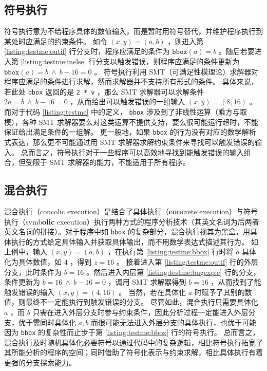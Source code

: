\subsection{符号执行}

符号执行\cite{symbexe}意为不给程序具体的数值输入，而是暂时用符号替代，并维护程序执行到某处时应满足的约束条件。
如令 $(x, y) = (a, b)$ ，则进入第 \ref{listing:testme:outif} 行分支时，程序应满足的条件为 $\texttt{bbox}(a) = b$ 。随后若要进入第 \ref{listing:testme:inelse} 行分支以触发错误，则程序应满足的条件更新为 $\texttt{bbox}(a) = b ~\wedge~ b - 16 = 0$ 。
符号执行利用 SMT（可满足性模理论）求解器对程序应满足的条件进行求解，然而求解器并不支持所有形式的条件。
具体来说，若此处 \texttt{bbox} 返回的是 \texttt{2 * v} ，那么 SMT 求解器可以求解条件 $2a = b ~\wedge~ b - 16 = 0$ ，从而给出可以触发错误的一组输入 $(x, y) = (8, 16)$ 。
而对于代码 \ref{listing:testme} 中的定义， \texttt{bbox} 涉及到了非线性运算（乘方与取模），各种 SMT 求解器要么对这类运算不提供支持，要么很可能运行超时，不能保证给出满足条件的一组解。
更一般地，如果 \texttt{bbox} 的行为没有对应的数学解析式表达，那么更不可能通过用 SMT 求解器求解约束条件来寻找可以触发错误的输入。
总而言之，符号执行对于一些程序可以高效地寻找到能触发错误的输入组合，但受限于 SMT 求解器的能力，不能适用于所有程序。

\subsection{混合执行}

混合执行（concolic execution）\cite{dart, cute}是结合了具体执行（\textbf{conc}rete execution）与符号执行（symb\textbf{olic} execution）执行两种方式的程序分析技术（其英文名词为后两者英文名词的拼接）。对于程序中如 \texttt{bbox} 的复杂部分，混合执行视其为黑盒，用具体执行的方式给定具体输入并获取具体输出，而不用数学表达式描述其行为。
如上例中，输入 $(x, y) = (a, b)$ ，在执行第 \ref{listing:testme:bbox} 行时将 $a$ 具体化为具体数值，如 $4$ ，得到 $z = 16$ 。
接着进入第 \ref{listing:testme:outif} 行的外层分支，此时条件为 $b = 16$ 。然后进入内层第 \ref{listing:testme:bugexp:e} 行的分支，条件更新为 $b = 16 ~\wedge~ b - 16 = 0$ ，调用 SMT 求解器得到 $b = 16$ ，从而找到了能触发错误的输入 $(x, y) = (4, 16)$ 。
当然，若在具体化 $a$ 时赋予了其别的数值，则最终不一定能执行到触发错误的分支。
尽管如此，混合执行只需要具体化 $a$ ，而 $b$ 只需在进入外层分支时参与约束条件，因此分析过程一定能进入外层分支，优于需同时具体化 $a, b$ 而很可能无法进入外层分支的具体执行，也优于可能因为 \texttt{bbox} 的复杂性而止步于第 \ref{listing:testme:bbox} 行的符号执行。
总而言之，混合执行及时随机具体化必要符号以通过代码中的复杂逻辑，相比符号执行拓宽了其所能分析的程序的空间；同时借助了符号化表示与约束求解，相比具体执行有着更强的分支探索能力。

